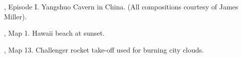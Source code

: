 \begin{minipage}{\textwidth}
\par \vspace{5pt}
\doom{}, Episode I. Yangshuo Cavern in China. (All compositions courtesy of James Miller).\\
\par
{}
\end{minipage}
\par






\begin{minipage}{\textwidth}
\par \vspace{5pt}
\doomii{}, Map 1. Hawaii beach at sunset.\\
\par
{}
\end{minipage}


\begin{minipage}{\textwidth}
\par \vspace{5pt}
\doomii{}, Map 13. Challenger rocket take-off used for burning city clouds.\\
\par
{}
\end{minipage}







